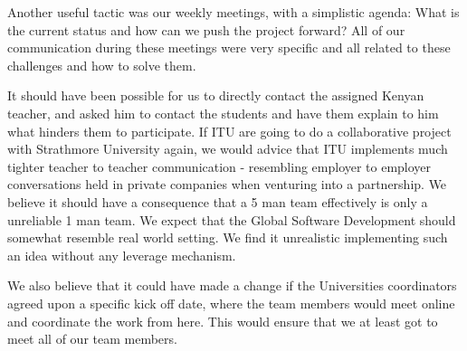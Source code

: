 Another useful tactic was our weekly meetings, with a simplistic agenda: What is the current status and how can we push the project forward? All of our communication during these meetings were very specific and all related to these challenges and how to solve them. 

It should have been possible for us to directly contact the assigned Kenyan teacher, and asked him to contact the students and have them explain to him what hinders them to participate. If ITU are going to do a collaborative project with Strathmore University again, we would advice that ITU implements much tighter teacher to teacher communication - resembling employer to employer conversations held in private companies when venturing into a partnership. We believe it should have a consequence that a 5 man team effectively is only a unreliable 1 man team. We expect that the Global Software Development should somewhat resemble real world setting. We find it unrealistic implementing such an idea without any leverage mechanism. 

We also believe that it could have made a change if the Universities coordinators agreed upon a specific kick off date, where the team members would meet online and coordinate the work from here. This would ensure that we at least got to meet all of our team members. 